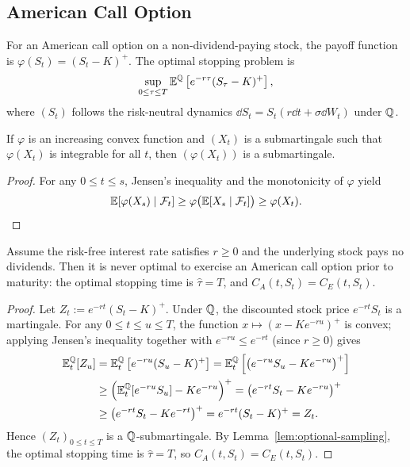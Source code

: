 \subsection*{American Call Option}

For an American call option on a non-dividend-paying stock, the payoff function is $\varphi(S_t) = (S_t - K)^+$. The optimal stopping problem is
\[
\sup_{0 \le \tau \le T} \mathbb{E}^{\mathbb{Q}}\left[e^{-r\tau}(S_\tau - K)^+\right],
\]
where $(S_t)$ follows the risk-neutral dynamics $\dd S_t = S_t(r\dd t + \sigma\dd W_t)$ under $\mathbb{Q}$.

\begin{lemma}\label{lem:convex-submartingale}
    If $\varphi$ is an increasing convex function and $(X_t)$ is a submartingale such that $\varphi(X_t)$ is integrable for all $t$, then $(\varphi(X_t))$ is a submartingale.
\end{lemma}
\begin{proof}
    For any $0 \le t \le s$, Jensen's inequality and the monotonicity of $\varphi$ yield
    \[
    \mathbb{E}[\varphi(X_s) \mid \mathcal{F}_t] \ge \varphi\bigl(\mathbb{E}[X_s \mid \mathcal{F}_t]\bigr) \ge \varphi(X_t). \qedhere
    \]
\end{proof}

\begin{theorem}\label{thm:american-call-no-early-exercise}
    Assume the risk-free interest rate satisfies $r \ge 0$ and the underlying stock pays no dividends. Then it is never optimal to exercise an American call option prior to maturity: the optimal stopping time is $\hat{\tau} = T$, and $C_A(t, S_t) = C_E(t, S_t)$.
\end{theorem}
\begin{proof}
    Let $Z_t := e^{-rt}(S_t - K)^+$. Under $\mathbb{Q}$, the discounted stock price $e^{-rt}S_t$ is a martingale. For any $0 \le t \le u \le T$, the function $x \mapsto (x - K e^{-ru})^+$ is convex; applying Jensen's inequality together with $e^{-ru} \le e^{-rt}$ (since $r \ge 0$) gives
    \[
    \begin{aligned}
        \mathbb{E}_t^{\mathbb{Q}}[Z_u] &= \mathbb{E}_t^{\mathbb{Q}}\left[e^{-ru}(S_u - K)^+\right] = \mathbb{E}_t^{\mathbb{Q}}\left[\left(e^{-ru}S_u - K e^{-ru}\right)^+\right] \\
        &\ge \left(\mathbb{E}_t^{\mathbb{Q}}[e^{-ru}S_u] - K e^{-ru}\right)^+ = \left(e^{-rt}S_t - K e^{-ru}\right)^+ \\
        &\ge \left(e^{-rt}S_t - K e^{-rt}\right)^+ = e^{-rt}(S_t - K)^+ = Z_t.
    \end{aligned}
    \]
    Hence $(Z_t)_{0 \le t \le T}$ is a $\mathbb{Q}$-submartingale. By Lemma~\ref{lem:optional-sampling}, the optimal stopping time is $\hat{\tau} = T$, so $C_A(t, S_t) = C_E(t, S_t)$.
\end{proof}

